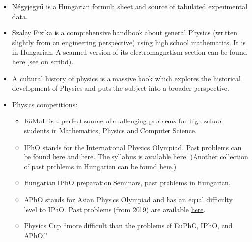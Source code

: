 \documentclass{article}
\begin{document}
\begin{itemize}
\item \href{https://ppeter.apaczai.elte.hu/erettsegi/Negyjegyu_fuggvenytablazat.pdf}{Négyjegyű} is a Hungarian formula sheet and source of tabulated experimental data.

\item \href{https://en.mandadb.hu/tetel/357528/Fizika}{Szalay Fizika} is a comprehensive handbook about general Physics (written slightly from an engineering perspective) using high school mathematics. It is in Hungarian. A scanned version of its electromagnetism section can be found \href{https://web.archive.org/web/20200317111146/http://users.atw.hu/gepesz-lev/4felev/fizika.pdf}{here} (see on \href{https://www.scribd.com/document/492897465/Szalay-Fizika}{scribd}).

\item \href{https://www.goodreads.com/book/show/13335561-a-cultural-history-of-physics}{A cultural history of physics} is a massive book which explores the historical development of Physics and puts the subject into a broader perspective.

\item Physics competitions:
\begin{itemize}
\item \href{https://www.komal.hu/home.e.shtml}{KöMaL} is a perfect source of challenging problems for high school students in Mathematics, Physics and Computer Science.

\item \href{https://ipho-unofficial.org/}{IPhO} stands for the International Physics Olympiad. Past problems can be found \href{https://physprob.com/}{here} and \href{https://omega4edu.org/physics.html}{here}. The syllabus is available \href{https://www.ipho-new.org/statutes-syllabus/}{here}. (Another collection of past problems in Hungarian can be found  \href{http://ipho.elte.hu/iphos.php}{here}.)

\item \href{https://ipho.physics.bme.hu/}{Hungarian IPhO preparation} Seminars, past problems in Hungarian.

\item \href{http://asianphysicsolympiad.org/}{APhO} stands for Asian Physics Olympiad and has an equal difficulty level to IPhO. Past problems (from 2019) are available \href{https://apho2019.asi.edu.au/resources/past-questions/}{here}.

\item \href{https://physicscup.ee/}{Physics Cup} ``more difficult than the problems of EuPhO, IPhO, and APhO.''


\end{itemize}
\end{itemize}
\end{document}
